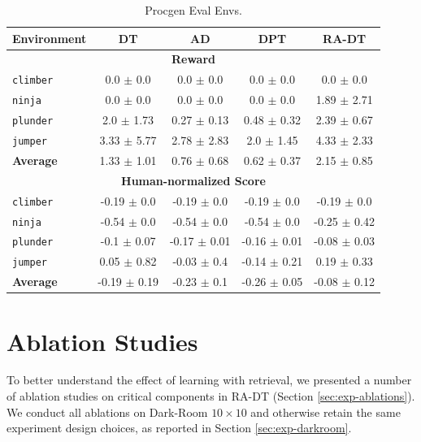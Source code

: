 \begin{table}[h]
    \centering
    \caption{Procgen Eval Envs.}
    \begin{tabular}{@{} l c c c c@{}}
    \toprule
    \textbf{Environment} & \textbf{DT} & \textbf{AD} & \textbf{DPT} & \textbf{RA-DT} \\ \midrule
    \multicolumn{5}{c}{\textbf{Reward}} \\ 
    \texttt{climber} & 0.0 $\pm$ 0.0 & 0.0 $\pm$ 0.0 & 0.0 $\pm$ 0.0 & 0.0 $\pm$ 0.0 \\
    \texttt{ninja} & 0.0 $\pm$ 0.0 & 0.0 $\pm$ 0.0 & 0.0 $\pm$ 0.0 & 1.89 $\pm$ 2.71 \\
    \texttt{plunder} & 2.0 $\pm$ 1.73 & 0.27 $\pm$ 0.13 & 0.48 $\pm$ 0.32 & 2.39 $\pm$ 0.67 \\
    \texttt{jumper} & 3.33 $\pm$ 5.77 & 2.78 $\pm$ 2.83 & 2.0 $\pm$ 1.45 & 4.33 $\pm$ 2.33 \\
    \textbf{Average} & 1.33 $\pm$ 1.01 & 0.76 $\pm$ 0.68 & 0.62 $\pm$ 0.37 & 2.15 $\pm$ 0.85 \\ \midrule
    \multicolumn{5}{c}{\textbf{Human-normalized Score}} \\ 
    \texttt{climber} & -0.19 $\pm$ 0.0 & -0.19 $\pm$ 0.0 & -0.19 $\pm$ 0.0 & -0.19 $\pm$ 0.0 \\
    \texttt{ninja} & -0.54 $\pm$ 0.0 & -0.54 $\pm$ 0.0 & -0.54 $\pm$ 0.0 & -0.25 $\pm$ 0.42 \\
    \texttt{plunder} & -0.1 $\pm$ 0.07 & -0.17 $\pm$ 0.01 & -0.16 $\pm$ 0.01 & -0.08 $\pm$ 0.03 \\
    \texttt{jumper} & 0.05 $\pm$ 0.82 & -0.03 $\pm$ 0.4 & -0.14 $\pm$ 0.21 & 0.19 $\pm$ 0.33 \\
    \textbf{Average} & -0.19 $\pm$ 0.19 & -0.23 $\pm$ 0.1 & -0.26 $\pm$ 0.05 & -0.08 $\pm$ 0.12 \\ \bottomrule
    \end{tabular}
    \label{tab:procgen-eval}
\end{table}

\section{Ablation Studies}\label{appendix:ablations}
To better understand the effect of learning with retrieval, we presented a number of ablation studies on critical components in RA-DT (Section \ref{sec:exp-ablations}).
We conduct all ablations on Dark-Room $10\times 10$ and otherwise retain the same experiment design choices, as reported in Section \ref{sec:exp-darkroom}.

